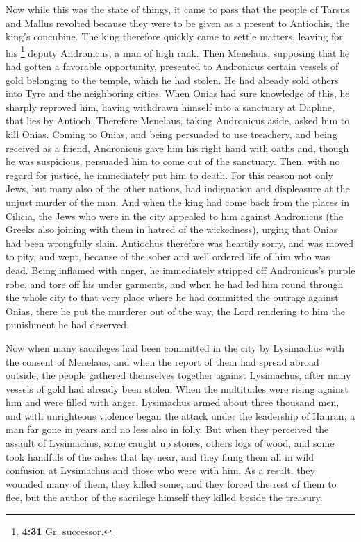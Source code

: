  Now while this was the state of things, it came to pass
that the people of Tarsus and Mallus revolted because they were to be
given as a present to Antiochis, the king's concubine. 
The king therefore quickly came to settle matters, leaving for his
\footnote{\textbf{4:31} Gr. successor.} deputy Andronicus, a man of high
rank.  Then Menelaus, supposing that he had gotten a
favorable opportunity, presented to Andronicus certain vessels of gold
belonging to the temple, which he had stolen. He had already sold others
into Tyre and the neighboring cities.  When Onias had
sure knowledge of this, he sharply reproved him, having withdrawn
himself into a sanctuary at Daphne, that lies by Antioch.
 Therefore Menelaus, taking Andronicus aside, asked him
to kill Onias. Coming to Onias, and being persuaded to use treachery,
and being received as a friend, Andronicus gave him his right hand with
oaths and, though he was suspicious, persuaded him to come out of the
sanctuary. Then, with no regard for justice, he immediately put him to
death.  For this reason not only Jews, but many also of
the other nations, had indignation and displeasure at the unjust murder
of the man.  And when the king had come back from the
places in Cilicia, the Jews who were in the city appealed to him against
Andronicus (the Greeks also joining with them in hatred of the
wickedness), urging that Onias had been wrongfully slain.
 Antiochus therefore was heartily sorry, and was moved to
pity, and wept, because of the sober and well ordered life of him who
was dead.  Being inflamed with anger, he immediately
stripped off Andronicus's purple robe, and tore off his under garments,
and when he had led him round through the whole city to that very place
where he had committed the outrage against Onias, there he put the
murderer out of the way, the Lord rendering to him the punishment he had
deserved.

 Now when many sacrileges had been committed in the city
by Lysimachus with the consent of Menelaus, and when the report of them
had spread abroad outside, the people gathered themselves together
against Lysimachus, after many vessels of gold had already been stolen.
 When the multitudes were rising against him and were
filled with anger, Lysimachus armed about three thousand men, and with
unrighteous violence began the attack under the leadership of Hauran, a
man far gone in years and no less also in folly.  But
when they perceived the assault of Lysimachus, some caught up stones,
others logs of wood, and some took handfuls of the ashes that lay near,
and they flung them all in wild confusion at Lysimachus and those who
were with him.  As a result, they wounded many of them,
they killed some, and they forced the rest of them to flee, but the
author of the sacrilege himself they killed beside the treasury.

